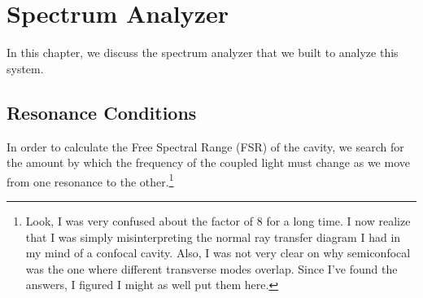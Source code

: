 \chapter{Spectrum Analyzer}
\label{Spectrum Analyzer}






In this chapter, we discuss the spectrum analyzer that we built to analyze this system. 



\section{Resonance Conditions}
In order to calculate the Free Spectral Range (FSR) of the cavity, we search for the amount by which the frequency of the coupled light must change as we move from one resonance to the other.\footnote{Look, I was very confused about the factor of 8 for a long time. I now realize that I was simply misinterpreting the normal ray transfer diagram I had in my mind of a confocal cavity. Also, I was not very clear on why semiconfocal was the one where different transverse modes overlap. Since I've found the answers, I figured I might as well put them here.} 

